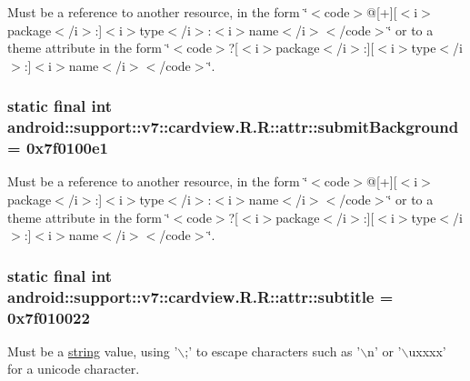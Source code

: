 Must be a reference to another resource, in the form \char`\"{}$<$code$>$@\mbox{[}+\mbox{]}\mbox{[}$<$i$>$package$<$/i$>$:\mbox{]}$<$i$>$type$<$/i$>$:$<$i$>$name$<$/i$>$$<$/code$>$\char`\"{} or to a theme attribute in the form \char`\"{}$<$code$>$?\mbox{[}$<$i$>$package$<$/i$>$:\mbox{]}\mbox{[}$<$i$>$type$<$/i$>$:\mbox{]}$<$i$>$name$<$/i$>$$<$/code$>$\char`\"{}. \hypertarget{classandroid_1_1support_1_1v7_1_1cardview_1_1_r_1_1attr_53ae5a797eb8b890b1a83ec3a0e3463d}{
\subsubsection[{submitBackground}]{\setlength{\rightskip}{0pt plus 5cm}static final int android::support::v7::cardview.R.R::attr::submitBackground = 0x7f0100e1}}
\label{classandroid_1_1support_1_1v7_1_1cardview_1_1_r_1_1attr_53ae5a797eb8b890b1a83ec3a0e3463d}


Must be a reference to another resource, in the form \char`\"{}$<$code$>$@\mbox{[}+\mbox{]}\mbox{[}$<$i$>$package$<$/i$>$:\mbox{]}$<$i$>$type$<$/i$>$:$<$i$>$name$<$/i$>$$<$/code$>$\char`\"{} or to a theme attribute in the form \char`\"{}$<$code$>$?\mbox{[}$<$i$>$package$<$/i$>$:\mbox{]}\mbox{[}$<$i$>$type$<$/i$>$:\mbox{]}$<$i$>$name$<$/i$>$$<$/code$>$\char`\"{}. \hypertarget{classandroid_1_1support_1_1v7_1_1cardview_1_1_r_1_1attr_b40349ba30e30d1f1912062b3cc792de}{
\subsubsection[{subtitle}]{\setlength{\rightskip}{0pt plus 5cm}static final int android::support::v7::cardview.R.R::attr::subtitle = 0x7f010022}}
\label{classandroid_1_1support_1_1v7_1_1cardview_1_1_r_1_1attr_b40349ba30e30d1f1912062b3cc792de}


Must be a \hyperlink{classandroid_1_1support_1_1v7_1_1cardview_1_1_r_1_1string}{string} value, using '$\backslash$;' to escape characters such as '$\backslash$n' or '$\backslash$uxxxx' for a unicode character. 

